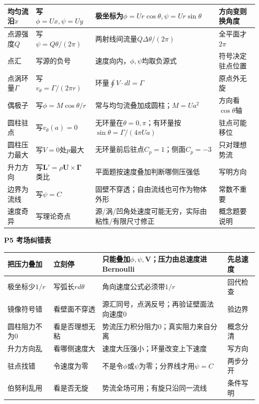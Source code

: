 \documentclass[UTF8,a4paper]{ctexart}
\newcommand{\ftitle}[1]{\vspace{1pt}\textbf{\textcolor{B}{#1}}\par\vspace{0.5pt}}
\begin{document}
\begin{tabular}{|L{0.19\textwidth}|L{0.23\textwidth}|L{0.34\textwidth}|L{0.19\textwidth}|}\hline
均匀流沿$x$ & 写$\phi=Ux,\psi=Uy$ & 极坐标为$\phi=Ur\cos\theta,\psi=Ur\sin\theta$ & 方向变则换角度 \\\hline
点源强度$Q$ & 写$\psi=Q\theta/(2\pi)$ & 两射线间流量$Q\Delta\theta/(2\pi)$ & 全平面才$2\pi$ \\\hline
点汇 & 写源的负号 & 速度向内，$\phi,\psi$均取负源式 & 符号决定驻点位置 \\\hline
点涡环量$\Gamma$ & 写$v_\theta=\Gamma/(2\pi r)$ & 环量$\oint V\cdot dl=\Gamma$ & 原点外无旋 \\\hline
偶极子 & 写$\phi=M\cos\theta/r$ & 常与均匀流叠加成圆柱；$M=Ua^2$ & 方向看$\cos\theta$轴 \\\hline
圆柱驻点 & 写$v_\theta(a)=0$ & 无环量在$\theta=0,\pi$；有环量按$\sin\theta=\Gamma/(4\pi Ua)$ & 驻点可能移位 \\\hline
圆柱压力最大 & 写$V=0$处$p$最大 & 无环量前后驻点$C_p=1$；侧面$C_p=-3$ & 只对理想势流 \\\hline
升力方向 & 写$\bm L'=\rho \bm U\times \bm\Gamma$类比 & 平面题按速度叠加判断哪侧压强低 & 写明方向 \\\hline
边界为流线 & 写$\psi=C$ & 固壁不穿透；自由流线也可作为物体外形 & 常数不重要 \\\hline
速度奇异 & 写理论奇点 & 源/涡/凹角处速度可能无穷，实际由粘性/有限尺寸修正 & 概念题要说明 \\\hline
\end{tabular}
\ftitle{P5 考场纠错表}
\begin{tabular}{|L{0.22\textwidth}|L{0.25\textwidth}|L{0.33\textwidth}|L{0.15\textwidth}|}\hline
把压力叠加 & 立刻停 & 只能叠加$\phi,\psi,\bm V$；压力由总速度进Bernoulli & 先总速度 \\\hline
极坐标少$1/r$ & 写弧长$r d\theta$ & 角向速度公式必须带$1/r$ & 回代检查 \\\hline
镜像符号错 & 看壁面不穿透 & 源汇同号，点涡反号；再验证壁面法向速度0 & 验边界 \\\hline
圆柱阻力不为0 & 看是否理想无粘 & 势流压力积分阻力0；真实阻力来自分离 & 概念分清 \\\hline
升力方向乱 & 看哪侧速度大 & 速度大压强小；环量改变上下速度 & 写方向 \\\hline
驻点找错 & 令速度为零 & 不是令$\phi$或$\psi$为零；分界线才用$\psi=C$ & 两步分开 \\\hline
伯努利乱用 & 看是否无旋 & 势流全场可用；有旋只沿同一流线 & 条件写明 \\\hline
\end{tabular}
\newpage
\end{document}
